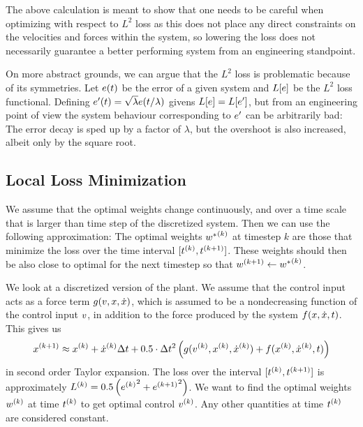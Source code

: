 \documentclass{article}
\begin{document}
    The above calculation is meant to show that one needs to be careful when optimizing 
    with respect to $L^2$ loss as this does not place any direct constraints on the 
    velocities and forces within the system, so lowering the loss does not necessarily
    guarantee a better performing system from an engineering standpoint.

    On more abstract grounds, we can argue that the $L^2$ loss is problematic because of its symmetries. Let $e(t)$ be
    the error of a given system and $L[e]$ be the $L^2$ loss functional. Defining 
    $e^\prime(t) = \sqrt{\lambda} e(t/\lambda)$ givens $L[e] = L[e^\prime]$, but from an 
    engineering point of view the system behaviour corresponding to $e^\prime$ can be arbitrarily bad: The error
    decay is sped up by a factor of $\lambda$, but the overshoot is also increased, albeit only by the square root. 



  \subsection{Local Loss Minimization}
    We assume that the optimal weights change continuously, and over a time scale that is 
    larger than time step of the discretized system. Then we can use the following approximation: The optimal weights 
    ${w^*}^{(k)}$ at timestep $k$ are those that minimize the loss over the time interval $[{t}^{(k)}, {t}^{(k+1)}]$. 
    These weights should then be also close to optimal for the next timestep so that 
    ${w}^{(k+1)} \leftarrow {w^*}^{(k)}$.

    We look at a discretized version of the plant. 
    We assume that the control input acts as a force term $g(v, x, \dot{x})$, 
    which is assumed to be a nondecreasing function of the control input $v$,
    in addition to the force produced 
    by the system $f(x, \dot{x}, t)$. This gives us 
    \begin{align}
        {x}^{(k+1)} \approx {x}^{(k)} + {\dot{x}}^{(k)} \Delta t + 0.5 \cdot \Delta t^2 \left( g({v}^{(k)}, {x}^{(k)}, {\dot{x}}^{(k)}) + f({x}^{(k)}, {\dot{x}}^{(k)}, t) \right)
    \end{align}
    in second order Taylor expansion. The loss over the interval $[{t}^{(k)}, {t}^{(k+1)}]$ is approximately
    ${L}^{(k)} = 0.5 \left( {{e}^{(k)}}^2 + {{e}^{(k+1)}}^2 \right)$. 
    We want to find the optimal weights ${w}^{(k)}$ at time ${t}^{(k)}$ to get optimal control ${v}^{(k)}$. 
    Any other quantities at time ${t}^{(k)}$ are considered constant.
\end{document}
